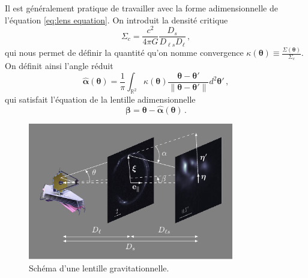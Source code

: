 Il est généralement pratique de travailler avec la forme adimensionnelle de l'équation \eqref{eq:lens equation}. 
On introduit la densité critique 
\begin{equation}\label{eq:densite critique}
        \Sigma_c = \frac{c^2}{4 \pi G}\frac{D_{s}}{D_{\ell s} D_\ell}\, ,
\end{equation} 
qui nous permet de définir la quantité qu'on nomme convergence $\displaystyle \kappa(\boldsymbol{ \theta} ) \equiv \frac{\Sigma(\boldsymbol{ \theta})}{\Sigma_c}$. 
On définit ainsi l'angle réduit 
\begin{equation}\label{eq:alpha adim}
        \hat{\boldsymbol{ \alpha}} (\boldsymbol{ \theta}) = \frac{1}{\pi}\int_{\mathbb{R}^{2}} \kappa(\boldsymbol{ \theta} )
        \frac{\boldsymbol{ \theta} - \boldsymbol{ \theta}'  }{\lVert \boldsymbol{ \theta} - \boldsymbol{ \theta}' \rVert  } d^{2}\boldsymbol{ \theta}'\, ,
\end{equation} 
qui satisfait l'équation de la lentille adimensionnelle 
\begin{equation}\label{eq:lens equation adim}
        \boldsymbol{ \beta} = \boldsymbol{ \theta} - \hat{\boldsymbol{ \alpha}}(\boldsymbol{ \theta})\, . 
\end{equation}

\begin{figure}[H]
        \centering
        \includegraphics[width=0.8\textwidth]{figures/lensing_cartoon}
        \caption{Schéma d'une lentille gravitationnelle.}
        \label{fig:cartoon}
\end{figure}


% 





